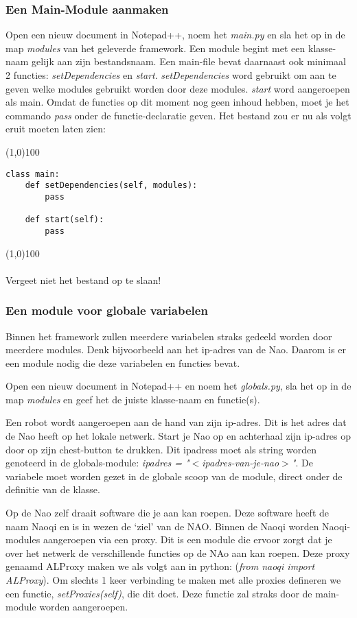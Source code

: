 \documentclass[a4paper]{article}
\begin{document}
\subsubsection{Een Main-Module aanmaken}
Open een nieuw document in Notepad++, noem het \textit{main.py} en sla het op in de map \textit{modules} van het geleverde framework. 
Een module begint met een klasse-naam gelijk aan zijn bestandsnaam. Een main-file bevat daarnaast ook minimaal 2 functies: \textit{setDependencies} en \textit{start}. \textit{setDependencies} word gebruikt om aan te geven welke modules gebruikt worden door deze modules. \textit{start} word aangeroepen als main.
Omdat de functies op dit moment nog geen inhoud hebben, moet je het commando \textit{pass} onder de functie-declaratie geven. Het bestand zou er nu als volgt eruit moeten laten zien:

\noindent \line(1,0){100}
\begin{verbatim}
class main:
    def setDependencies(self, modules):
        pass

    def start(self):
        pass
\end{verbatim}
\noindent \line(1,0){100}
\\\\
Vergeet niet het bestand op te slaan!

\subsubsection{Een module voor globale variabelen}
Binnen het framework zullen meerdere variabelen straks gedeeld worden door meerdere modules. Denk bijvoorbeeld aan het ip-adres van de Nao. Daarom is er een module nodig die deze variabelen en functies bevat.

Open een nieuw document in Notepad++ en noem het \textit{globals.py}, sla het op in de map \textit{modules} en geef het de juiste klasse-naam en functie(s). 

Een robot wordt aangeroepen aan de hand van zijn ip-adres. Dit is het adres dat de Nao heeft op het lokale netwerk. Start je Nao op en achterhaal zijn ip-adres op door op zijn chest-button te drukken. Dit ipadress moet als string worden genoteerd in de globals-module: \textit{ ipadres = "$<$ipadres-van-je-nao$>$"}. De variabele moet worden gezet in de globale scoop van de module, direct onder de definitie van de klasse.

Op de Nao zelf draait software die je aan kan roepen. Deze software heeft de naam Naoqi en is in wezen de `ziel' van de NAO.
Binnen de Naoqi worden Naoqi-modules aangeroepen via een proxy. Dit is een module die ervoor zorgt dat je over het netwerk de verschillende functies op de NAo aan kan roepen. Deze proxy genaamd ALProxy maken we als volgt aan in python: (\textit{from naoqi import ALProxy}). Om slechts 1 keer verbinding te maken met alle proxies defineren we een functie, \textit{setProxies(self)}, die dit doet. Deze functie zal straks door de main-module worden aangeroepen.
\end{document}

